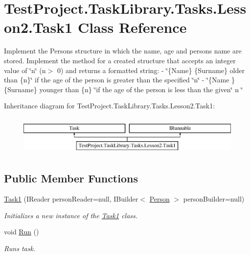 \hypertarget{class_test_project_1_1_task_library_1_1_tasks_1_1_lesson2_1_1_task1}{}\section{Test\+Project.\+Task\+Library.\+Tasks.\+Lesson2.\+Task1 Class Reference}
\label{class_test_project_1_1_task_library_1_1_tasks_1_1_lesson2_1_1_task1}


Implement the Person\textquotesingle{}s structure in which the name, age and person\textquotesingle{}s name are stored. Implement the method for a created structure that accepts an integer value of \char`\"{}n\char`\"{} (n$>$ 0) and returns a formatted string\+: -\/ \char`\"{}\{\+Name\} \{\+Surname\}
older than \{n\}\char`\"{} if the age of the person is greater than the specified \char`\"{}n\char`\"{} -\/ \char`\"{}\{\+Name \} \{\+Surname\} younger than \{n\} \char`\"{}if the age of the person is less than the given\char`\"{} n \char`\"{}  


Inheritance diagram for Test\+Project.\+Task\+Library.\+Tasks.\+Lesson2.\+Task1\+:\begin{figure}[H]
\begin{center}
\leavevmode
\includegraphics[height=2.000000cm]{class_test_project_1_1_task_library_1_1_tasks_1_1_lesson2_1_1_task1}
\end{center}
\end{figure}
\subsection*{Public Member Functions}
\begin{DoxyCompactItemize}
\item 
\mbox{\hyperlink{class_test_project_1_1_task_library_1_1_tasks_1_1_lesson2_1_1_task1_a6fe662e31ee5bfc96716b7c2230b4636}{Task1}} (I\+Reader person\+Reader=null, I\+Builder$<$ \mbox{\hyperlink{struct_test_project_1_1_task_library_1_1_tasks_1_1_lesson2_1_1_models_1_1_person}{Person}} $>$ person\+Builder=null)
\begin{DoxyCompactList}\small\item\em Initializes a new instance of the \mbox{\hyperlink{class_test_project_1_1_task_library_1_1_tasks_1_1_lesson2_1_1_task1}{Task1}} class. \end{DoxyCompactList}\item 
void \mbox{\hyperlink{class_test_project_1_1_task_library_1_1_tasks_1_1_lesson2_1_1_task1_a85d2c7fb175006f04832937a7e08e19a}{Run}} ()
\begin{DoxyCompactList}\small\item\em Runs task. \end{DoxyCompactList}\end{DoxyCompactItemize}


